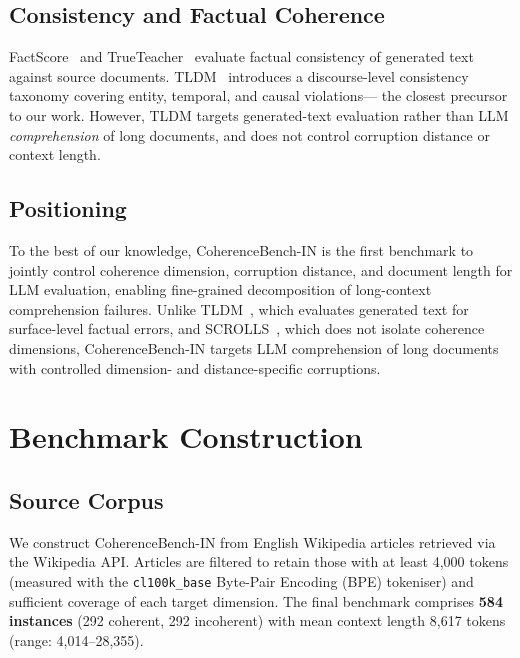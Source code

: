 \documentclass[conference]{IEEEtran}
\begin{document}
\subsection{Consistency and Factual Coherence}
FactScore~\cite{min2023} and TrueTeacher~\cite{gekhman2023} evaluate factual consistency
of generated text against source documents.
TLDM~\cite{hamilton2025tldm} introduces a discourse-level consistency taxonomy
covering entity, temporal, and causal violations---
the closest precursor to our work.
However, TLDM targets generated-text evaluation rather than
LLM \emph{comprehension} of long documents, and does not control
corruption distance or context length.

\subsection{Positioning}
To the best of our knowledge, CoherenceBench-IN is the first benchmark to jointly control
coherence dimension, corruption distance, and document length
for LLM evaluation, enabling fine-grained decomposition of
long-context comprehension failures.
Unlike TLDM~\cite{hamilton2025tldm}, which evaluates generated text for surface-level factual errors, and SCROLLS~\cite{shaham2022}, which does not isolate coherence dimensions, CoherenceBench-IN targets LLM comprehension of long documents with controlled dimension- and distance-specific corruptions.

\section{Benchmark Construction}
\subsection{Source Corpus}
We construct CoherenceBench-IN from English Wikipedia articles
retrieved via the Wikipedia API.
Articles are filtered to retain those with at least 4{,}000 tokens
(measured with the \texttt{cl100k\_base} Byte-Pair Encoding (BPE) tokeniser)
and sufficient coverage of each target dimension.
The final benchmark comprises \textbf{584 instances}
(292 coherent, 292 incoherent)
with mean context length 8,617 tokens
(range: 4,014--28,355).
\end{document}

